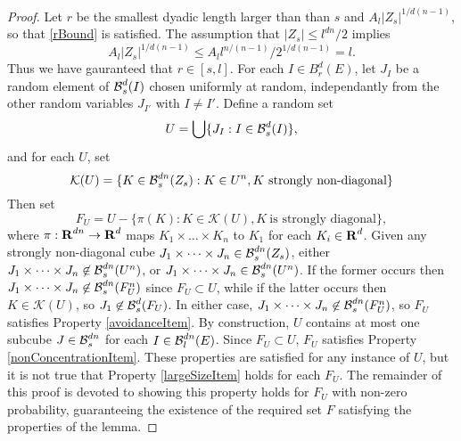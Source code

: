 \begin{proof}
	Let $r$ be the smallest dyadic length larger than than $s$ and $A_l |Z_s|^{1/d(n-1)}$, so that \eqref{rBound} is satisfied. The assumption that $|Z_s| \leq l^{dn}/2$ implies
	\[ A_l |Z_s|^{1/d(n-1)} \leq A_l l^{n/(n-1)} / 2^{1/d(n-1)} = l. \]
	Thus we have gauranteed that $r \in [s,l]$. For each $I \in B_r^d(E)$, let $J_I$ be a random element of $\operatorname{\mathcal{B}}^d_s(I)$ chosen uniformly at random, independantly from the other random variables $J_{I'}$ with $I \neq I'$. Define a random set
	\[ 	U = \bigcup \{ J_I : I \in \operatorname{\mathcal{B}}^d_s(I) \}, \]
	and for each $U$, set
	\[ \mathcal{K}(U) = \{ K \in \operatorname{\mathcal{B}}^{dn}_s(Z_s) : K \in U^n, \text{$K$ strongly non-diagonal} \} \]
	Then set
	\begin{equation} \label{defnOfF}
		F_U = U - \{ \pi(K): K \in \mathcal{K}(U), K\ \text{is strongly diagonal} \},
	\end{equation}
	where $\pi: \operatorname{\mathbf{R}}^{dn} \to \operatorname{\mathbf{R}}^d$ maps $K_1 \times \dots \times K_n$ to $K_1$ for each $K_i \in \operatorname{\mathbf{R}}^d$. Given any strongly non-diagonal cube $J_1 \times \cdots \times J_n \in \operatorname{\mathcal{B}}_s^{dn}(Z_s)$, either $J_1 \times \cdots \times J_n \not \in \operatorname{\mathcal{B}}_s^{dn}(U^n)$, or $J_1 \times \cdots \times J_n \in \operatorname{\mathcal{B}}_s^{dn}(U^n)$. If the former occurs then $J_1 \times \cdots \times J_n \not \in \operatorname{\mathcal{B}}_s^{dn}(F_U^n)$ since $F_U \subset U$, while if the latter occurs then $K \in \mathcal{K}(U)$, so $J_1 \not \in \operatorname{\mathcal{B}}_s^d(F_U)$. In either case, $J_1 \times \cdots \times J_n \not \in \operatorname{\mathcal{B}}_s^{dn}(F_U^n)$, so $F_U$ satisfies Property \ref{avoidanceItem}. By construction, $U$ contains at most one subcube $J \in \operatorname{\mathcal{B}}^{dn}_s$ for each $I \in \operatorname{\mathcal{B}}^{dn}_l(E)$. Since $F_U \subset U$, $F_U$ satisfies Property \ref{nonConcentrationItem}. These properties are satisfied for any instance of $U$, but it is not true that Property \ref{largeSizeItem} holds for each $F_U$. The remainder of this proof is devoted to showing this property holds for $F_U$ with non-zero probability, guaranteeing the existence of the required set $F$ satisfying the properties of the lemma.


\end{proof}

